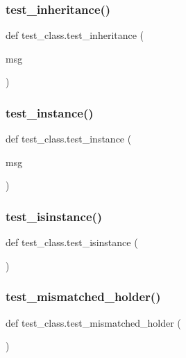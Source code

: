 \subsubsection{\texorpdfstring{test\_inheritance()}{test\_inheritance()}}
{\footnotesize\ttfamily def test\+\_\+class.\+test\+\_\+inheritance (\begin{DoxyParamCaption}\item[{}]{msg }\end{DoxyParamCaption})}

\mbox{\label{namespacetest__class_a1b8c06816f8a2343a4beb4379d529839}} 
\subsubsection{\texorpdfstring{test\_instance()}{test\_instance()}}
{\footnotesize\ttfamily def test\+\_\+class.\+test\+\_\+instance (\begin{DoxyParamCaption}\item[{}]{msg }\end{DoxyParamCaption})}

\mbox{\label{namespacetest__class_aefb1f40cbb5251b4542470204d44ffa6}} 
\subsubsection{\texorpdfstring{test\_isinstance()}{test\_isinstance()}}
{\footnotesize\ttfamily def test\+\_\+class.\+test\+\_\+isinstance (\begin{DoxyParamCaption}{ }\end{DoxyParamCaption})}

\mbox{\label{namespacetest__class_af11c9077874fa2e1cd7ded50f8c4d515}} 
\subsubsection{\texorpdfstring{test\_mismatched\_holder()}{test\_mismatched\_holder()}}
{\footnotesize\ttfamily def test\+\_\+class.\+test\+\_\+mismatched\+\_\+holder (\begin{DoxyParamCaption}{ }\end{DoxyParamCaption})}

